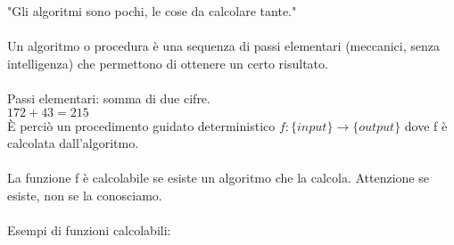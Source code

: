 \documentclass[10pt,a4paper]{book}
\begin{document}
"Gli algoritmi sono pochi, le cose da calcolare tante."\\\\
\noindent
Un algoritmo o procedura \`e una sequenza di passi elementari (meccanici, senza intelligenza) che permettono di ottenere un certo risultato.\\\\
Passi elementari: somma di due cifre.\\
$172+ 43 = 215$ 
\\
\`E perci\`o un procedimento guidato deterministico $f:\{input\} \longrightarrow \{output\}$ dove f \`e calcolata dall'algoritmo.\\\\
La funzione f \`e calcolabile se esiste un algoritmo che la calcola. Attenzione se esiste, non se la conosciamo.\\\\
Esempi di funzioni calcolabili:
\end{document}
